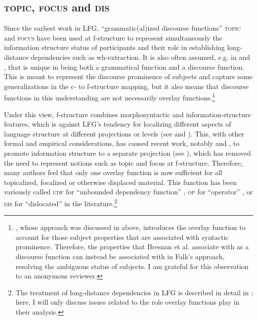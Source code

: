 \documentclass[output=paper]{../langscibook}
\begin{document}
 \subsection{\textsc{topic}, \textsc{focus} and \textsc{dis}\label{sect:gfs:topic}}
 \largerpage[-2]
 Since the earliest work in LFG, ``grammatic(al)ized discourse functions''  \textsc{topic} and \textsc{focus} have been used at f-structure to represent simultaneously the information structure status of participants and their role in establishing long-distance dependencies such as wh-extraction. It is also often assumed, e.g. in \citet{bresnan2001lexical} and \citet{BresnanEtAl2016}, that \SUBJ is unique in being both a grammatical function and a discourse function. This is meant to represent the discourse prominence of subjects and capture some generalizations in the c- to f-structure mapping, but it also means that discourse functions in this understanding are not necessarily overlay functions.\footnote{\citet{falk06}, whose approach was discussed in  above, introduces the overlay function \PIVOT to account for those subject properties that are associated with syntactic prominence. Therefore, the properties that Bresnan et al. associate with \SUBJ as a discourse function can instead be associated with \PIVOT in Falk's approach, resolving the ambiguous status of subjects. I am grateful for this observation to an anonymous reviewer.}
 
 Under this view, f-structure combines morphosyntactic and information-struc\-ture features, which is against LFG's tendency for localizing different aspects of language structure at different projections or levels (see  and ). This, with other formal and empirical considerations, has caused recent work, notably \citet{kingzaenen} and \citet{DN}, to promote information structure to a separate projection (see ), which has removed the need to represent notions such as topic and focus at f-structure. Therefore, many authors feel that only one overlay function is now sufficient for all topicalized, focalized or otherwise displaced material. This function has been variously called \textsc{udf} for ``unbounded dependency function'' \citep{Asudeh12}, \textsc{op} for ``operator'' \citep{alsina2008}, or \textsc{dis} for ``dislocated'' \citep{DLM:LFG} in the literature.\footnote{The treatment of long-distance dependencies in LFG is described in detail in ; here, I will only discuss issues related to the role overlay functions play in their analysis.}
 
\end{document}

